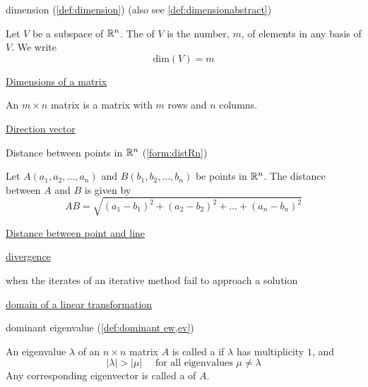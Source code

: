 \documentclass{ximera}
\begin{document}
dimension (\ref{def:dimension}) (also see \ref{def:dimensionabstract})
\begin{expandable}{}{}
    Let $V$ be a subspace of $\mathbb{R}^n$.  The  of $V$ is the number, $m$, of elements in any basis of $V$.  We write
$$\mbox{dim}(V)=m$$
\end{expandable}

\href{https://ximera.osu.edu/linearalgebradzv3/LinearAlgebraInteractiveIntro/RRN-0010/main}{Dimensions of a matrix}
\begin{expandable}{}{}
    An $m \times n$ matrix is a matrix with $m$ rows and $n$ columns.
\end{expandable}

\href{https://ximera.osu.edu/linearalgebradzv3/LinearAlgebraInteractiveIntro/RRN-0020/main}{Direction vector}

Distance between points in $\mathbb{R}^n$ (\ref{form:distRn})
\begin{expandable}{}{}
Let $A(a_1, a_2,\ldots ,a_n)$ and $B(b_1, b_2,\ldots ,b_n)$ be points in $\mathbb{R}^n$.  The distance between $A$ and $B$ is given by
$$AB=\sqrt{(a_1-b_1)^2+(a_2-b_2)^2+\ldots +(a_n-b_n)^2}$$
\end{expandable}

\href{https://ximera.osu.edu/linearalgebradzv3/LinearAlgebraInteractiveIntro/VEC-0070/main}{Distance between point and line}

\href{https://ximera.osu.edu/linearalgebradzv3/LinearAlgebraInteractiveIntro/SYS-0040/main}{divergence}
\begin{expandable}{}{}
    when the iterates of an iterative method fail to approach a solution
\end{expandable}

\href{https://ximera.osu.edu/linearalgebradzv3/LinearAlgebraInteractiveIntro/LTR-0010/main}{domain of a linear transformation} 

dominant eigenvalue (\ref{def:dominant ew,ev})
\begin{expandable}{}{}
    An eigenvalue $\lambda$ of an $n \times n$ matrix $A$ is called a  if $\lambda$ has multiplicity $1$, and
\begin{equation*}
|\lambda| > |\mu| \quad \mbox{ for all eigenvalues } \mu \neq \lambda
\end{equation*}
Any corresponding eigenvector is called a  of $A$.
\end{expandable}
\end{document}
